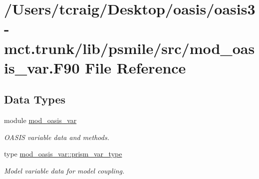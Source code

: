 \hypertarget{mod__oasis__var_8_f90}{\section{/\+Users/tcraig/\+Desktop/oasis/oasis3-\/mct.trunk/lib/psmile/src/mod\+\_\+oasis\+\_\+var.F90 File Reference}
\label{mod__oasis__var_8_f90}
}
\subsection*{Data Types}
\begin{DoxyCompactItemize}
\item 
module \hyperlink{classmod__oasis__var}{mod\+\_\+oasis\+\_\+var}
\begin{DoxyCompactList}\small\item\em O\+A\+S\+I\+S variable data and methods. \end{DoxyCompactList}\item 
type \hyperlink{structmod__oasis__var_1_1prism__var__type}{mod\+\_\+oasis\+\_\+var\+::prism\+\_\+var\+\_\+type}
\begin{DoxyCompactList}\small\item\em Model variable data for model coupling. \end{DoxyCompactList}\end{DoxyCompactItemize}
